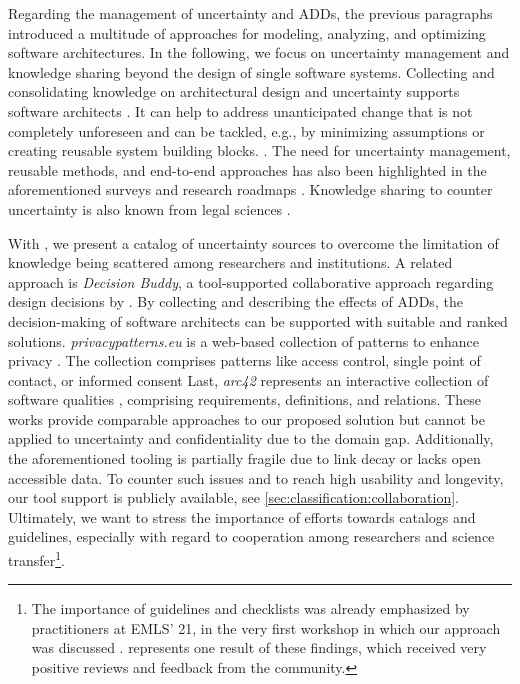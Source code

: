 Regarding the management of uncertainty and \acp{ADD}, the previous paragraphs introduced a multitude of approaches for modeling, analyzing, and optimizing software architectures.
In the following, we focus on uncertainty management and knowledge sharing beyond the design of single software systems.
Collecting and consolidating knowledge on architectural design and uncertainty supports software architects \cite{weyns_towards_2023,lytra_supporting_2013,zimmermann_reusable_2007,gerdes_decision_2015}.
It can help to address unanticipated change that is not completely unforeseen and can be tackled, e.g., by minimizing assumptions or creating reusable system building blocks. \cite{garlan_unknown_2021}.
The need for uncertainty management, reusable methods, and end-to-end approaches has also been highlighted in the aforementioned surveys and research roadmaps \cite{weyns_towards_2023,weyns_introduction_2020,troya_uncertainty_2021,hezavehi_uncertainty_2021}.
Knowledge sharing to counter uncertainty is also known from legal sciences \cite{sterz_intelligente_2022}.

With \arcen, we present a catalog of uncertainty sources to overcome the limitation of knowledge being scattered among researchers and institutions.
A related approach is \emph{Decision Buddy}, a tool-supported collaborative approach regarding design decisions by \textcite{gerdes_decision_2015}.
By collecting and describing the effects of \acp{ADD}, the decision-making of software architects can be supported with suitable and ranked solutions.
\emph{privacypatterns.eu} is a web-based collection of patterns to enhance privacy \textcite{colesky_system_2018}.
The collection comprises patterns like access control, single point of contact, or informed consent \cite{colesky_system_2018-1}
Last, \emph{arc42} represents an interactive collection of software qualities \cite{starke_arc42_2024}, comprising requirements, definitions, and relations.
These works provide comparable approaches to our proposed solution but cannot be applied to uncertainty and confidentiality due to the domain gap.
Additionally, the aforementioned tooling is partially fragile due to link decay \cite{goh_link_2007} or lacks open accessible data.
To counter such issues and to reach high usability and longevity, our tool support is publicly available, see \autoref{sec:classification:collaboration}.
Ultimately, we want to stress the importance of efforts towards catalogs and guidelines, especially with regard to cooperation among researchers and science transfer\footnote{The importance of guidelines and checklists was already emphasized by practitioners at EMLS' 21, in the very first workshop in which our approach was discussed \cite{hahner_dealing_2021}. \arcen represents one result of these findings, which received very positive reviews and feedback from the community.}.

